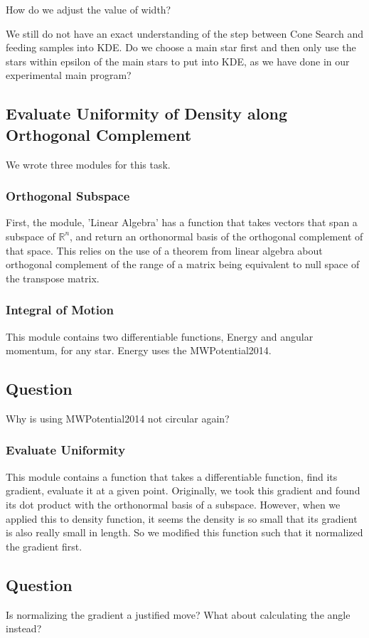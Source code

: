 \documentclass[12pt]{article}
\begin{document}
How do we adjust the value of width?

We still do not have an exact understanding of the step between Cone Search and feeding samples into KDE. Do we choose a main star first and then only use the stars within epsilon of the main stars to put into KDE, as we have done in our experimental main program?
\subsection{Evaluate Uniformity of Density along Orthogonal Complement}
We wrote three modules for this task. 
\subsubsection{Orthogonal Subspace}
First, the module, 'Linear Algebra' has a function that takes vectors that span a subspace of $\mathbb{R}^n$, and return an orthonormal basis of the orthogonal complement of that space. This relies on the use of a theorem from linear algebra about orthogonal complement of the range of a matrix being equivalent to null space of the transpose matrix.
\subsubsection{Integral of Motion}
This module contains two differentiable functions, Energy and angular momentum, for any star. Energy uses the MWPotential2014.
\subsection*{Question}
Why is using MWPotential2014 not circular again?
\subsubsection{Evaluate Uniformity}
This module contains a function that takes a differentiable function, find its gradient, evaluate it at a given point. Originally, we took this gradient and found its dot product with the orthonormal basis of a subspace. However, when we applied this to density function, it seems the density is so small that its gradient is also really small in length. So we modified this function such that it normalized the gradient first.
\subsection*{Question}
Is normalizing the gradient a justified move? What about calculating the angle instead?
\end{document}
